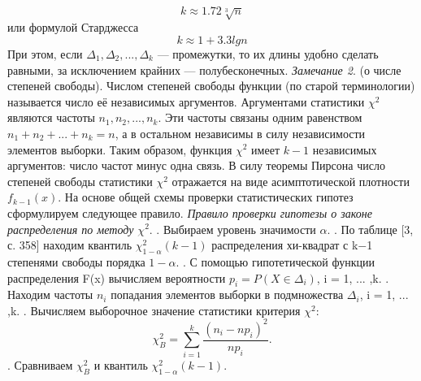 \documentclass[12pt,a4paper]{scrartcl}
\begin{document}
    \begin{equation}
        k \approx 1.72\sqrt[3]{n}
        \label{k_1}
    \end{equation}
    или формулой Старджесса
    \begin{equation}
        k \approx 1 + 3.3lgn
    \end{equation}
     При этом, если  $\Delta_{1},\Delta_{2}, ... ,\Delta_{k}$ — промежутки, то их длины удобно сделать равными, за исключением крайних — полубесконечных.
     \newline
    \textit{Замечание 2}. (о числе степеней свободы).
    Числом степеней свободы функции (по старой терминологии) называется число её независимых аргументов. Аргументами статистики $\chi^{2}$ являются частоты $n_{1},n_{2}, ... ,n_{k}$. Эти частоты связаны одним равенством $n_{1} + n_{2} + ... + n_{k}  = n$, а в остальном независимы в силу независимости элементов выборки. Таким образом, функция $\chi^{2}$  имеет $k-1$ независимых аргументов: число частот минус одна связь. В силу теоремы Пирсона число степеней свободы статистики $\chi^{2}$  отражается на виде асимптотической плотности $f_{k - 1}(x)$.
    \newline
    На основе общей схемы проверки статистических гипотез сформулируем следующее правило.
    \newline
    \textit{Правило проверки гипотезы о законе распределения по методу $\chi^{2}$}.
    . Выбираем уровень значимости $\alpha$.
     . По таблице [3, с. 358] находим квантиль $\chi^{2}_{1-\alpha}(k - 1)$ распределения хи-квадрат с k$-$1 степенями свободы порядка $1-\alpha$. 
    . С помощью гипотетической функции распределения F(x) вычисляем вероятности $p_{i} = P (X \in \Delta_{i})$, i = 1, ... ,k.
     . Находим частоты $n_{i}$ попадания элементов выборки в подмножества $\Delta_{i}$, i = 1, ... ,k. 
     . Вычисляем выборочное значение статистики критерия $\chi^{2}$:
    \begin{equation}
        \chi^{2}_{B} =\sum_{i = 1}^{k}{\frac{(n_{i} - np_{i})^{2}}{np_{i}}}.
        \label{chi_B}
    \end{equation}
    . Сравниваем $\chi^{2}_{B}$ и квантиль $\chi^{2}_{1-\alpha}(k-1)$.
    \newline
\end{document}
